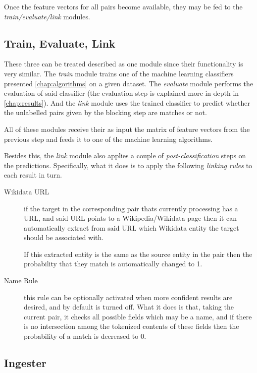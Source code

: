 \documentclass[epsfig,a4paper,11pt,titlepage,twoside,openany]{book}
\begin{document}
Once the feature vectors for all pairs become available, they may be fed to the \textit{train/evaluate/link} modules. 


\subsection{Train, Evaluate, Link}
\label{sec:soweego-st-train-evaluate-link}

These three can be treated described as one module since their functionality is very similar. The \textit{train} module trains one of the machine learning classifiers presented \autoref{chap:algorithms} on a given dataset. The \textit{evaluate} module performs the evaluation of said classifier (the evaluation step is explained more in depth in \autoref{chap:results}). And the \textit{link} module uses the trained classifier to predict whether the unlabelled pairs given by the blocking step are matches or not.

All of these modules receive their as input the matrix of feature vectors from the previous step and feeds it to one of the machine learning algorithms.

Besides this, the \textit{link} module also applies a couple of \textit{post-classification} steps on the predictions. Specifically, what it does is to apply the following \textit{linking rules} to each result in turn.

\begin{description}
\item[Wikidata URL] if the target in the corresponding pair thats currently processing has a URL, and said URL points to a Wikipedia/Wikidata page then it can automatically extract from said URL which Wikidata entity the target should be associated with. 

If this extracted entity is the same as the source entity in the pair then the probability that they match is automatically changed to 1. 

\item[Name Rule] this rule can be optionally activated when more confident results are desired, and by default is turned off. What it does is that, taking the current pair, it checks all possible fields which may be a name, and if there is no intersection among the tokenized contents of these fields then the probability of a match is decreased to 0.
\end{description}



\subsection{Ingester}
\label{sec:soweego-st-ingester}
\end{document}
